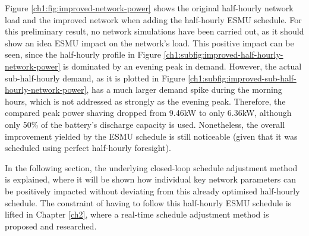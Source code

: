 

Figure \ref{ch1:fig:improved-network-power} shows the original half-hourly network load and the improved network when adding the half-hourly ESMU schedule.
For this preliminary result, no network simulations have been carried out, as it should show an idea ESMU impact on the network's load.
This positive impact can be seen, since the half-hourly profile in Figure \ref{ch1:subfig:improved-half-hourly-network-power} is dominated by an evening peak in demand.
However, the actual sub-half-hourly demand, as it is plotted in Figure \ref{ch1:subfig:improved-sub-half-hourly-network-power}, has a much larger demand spike during the morning hours, which is not addressed as strongly as the evening peak.
Therefore, the compared peak power shaving dropped from 9.46kW to only 6.36kW, although only 50\% of the battery's discharge capacity is used.
Nonetheless, the overall improvement yielded by the ESMU schedule is still noticeable (given that it was scheduled using perfect half-hourly foresight). 

In the following section, the underlying closed-loop schedule adjustment method is explained, where it will be shown how individual key network parameters can be positively impacted without deviating from this already optimised half-hourly schedule.
The constraint of having to follow this half-hourly ESMU schedule is lifted in Chapter \ref{ch2}, where a real-time schedule adjustment method is proposed and researched.
